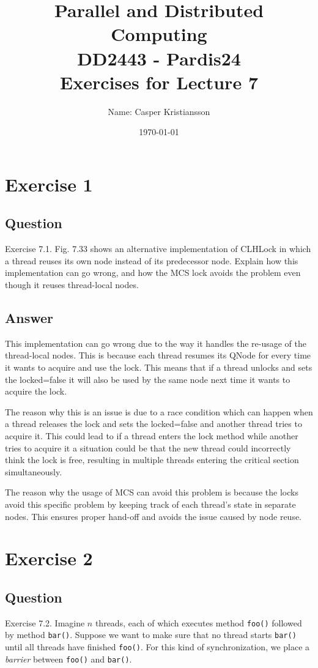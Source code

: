 \documentclass{article}
\title{\textbf{Parallel and Distributed Computing\\DD2443 - Pardis24\\Exercises for Lecture 7}}
\author{Name: Casper Kristiansson}
\date{\today}
\begin{document}
\setlength\parindent{0pt}
\setlength{\parskip}{\bigskipamount}

\maketitle

\section*{Exercise 1}
\subsection*{Question}
Exercise 7.1. Fig. 7.33 shows an alternative implementation of CLHLock in which a thread reuses its own node instead of its predecessor node. Explain how this implementation can go wrong, and how the MCS lock avoids the problem even though it reuses thread-local nodes.

\subsection*{Answer}

This implementation can go wrong due to the way it handles the re-usage of the thread-local nodes. This is because each thread resumes its QNode for every time it wants to acquire and use the lock. This means that if a thread unlocks and sets the locked=false it will also be used by the same node next time it wants to acquire the lock.

The reason why this is an issue is due to a race condition which can happen when a thread releases the lock and sets the locked=false and another thread tries to acquire it. This could lead to if a thread enters the lock method while another tries to acquire it a situation could be that the new thread could incorrectly think the lock is free, resulting in multiple threads entering the critical section simultaneously.

The reason why the usage of MCS can avoid this problem is because the locks avoid this specific problem by keeping track of each thread's state in separate nodes. This ensures proper hand-off and avoids the issue caused by node reuse.



\section*{Exercise 2}
\subsection*{Question}
Exercise 7.2. Imagine $n$ threads, each of which executes method \texttt{foo()} followed by method \texttt{bar()}. Suppose we want to make sure that no thread starts \texttt{bar()} until all threads have finished \texttt{foo()}. For this kind of synchronization, we place a \textit{barrier} between \texttt{foo()} and \texttt{bar()}.
\end{document}
